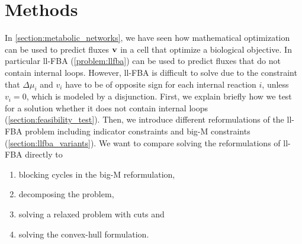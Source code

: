\thispagestyle{plain}
\section{Methods} \label{section:methods}

In \cref{section:metabolic_networks}, we have seen how mathematical optimization can be used to predict fluxes $\bold v$ in a cell that optimize a biological objective. In particular \textsf{ll-FBA} (\cref{problem:llfba}) can be used to predict fluxes that do not contain internal loops. However, \textsf{ll-FBA} is difficult to solve due to the constraint that $\Delta \mu_i$ and $v_i$ have to be of opposite sign for each internal reaction $i$, unless $v_i=0$, which is modeled by a disjunction. %
First, we explain briefly how we test for a solution whether it does not contain internal loops (\cref{section:feasibility_test}). Then, we introduce different reformulations of the \textsf{ll-FBA} problem including indicator constraints and big-M constraints (\cref{section:llfba_variants}).
We want to compare solving the reformulations of \textsf{ll-FBA} directly to 
\begin{enumerate}
    \item blocking cycles in the big-M reformulation,
    \item decomposing the problem,
    \item solving a relaxed problem with cuts and
    \item solving the convex-hull formulation.
\end{enumerate}

